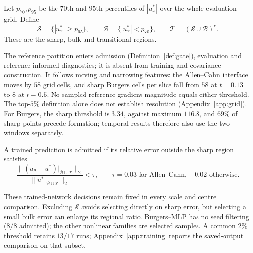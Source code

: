 \begin{samepage}
\begin{definition}\label{def:regions}
Let $p_{70},p_{95}$ be the $70$th and $95$th percentiles of $|u_x^\ast|$ over the
whole evaluation grid. Define
\[
 \mathcal S=\{|u_x^\ast|\ge p_{95}\},\qquad
 \mathcal B=\{|u_x^\ast|<p_{70}\},\qquad
 \mathcal T=(\mathcal S\cup\mathcal B)^c.
\]
These are the sharp, bulk and transitional regions.
\end{definition}
\end{samepage}
The reference partition enters admission (Definition~\ref{def:gate}), evaluation and
reference-informed diagnostics; it is absent from training and covariance construction.
It follows moving and narrowing
features: the Allen--Cahn interface moves by $58$ grid cells, and sharp Burgers cells
per slice fall from $58$ at $t=0.13$ to $8$ at $t=0.5$. No sampled reference-gradient
magnitude equals either threshold. The top-$5\%$ definition alone does not establish resolution
(Appendix~\ref{app:grid}). For Burgers, the sharp threshold is $3.34$, against
maximum $116.8$, and $69\%$ of sharp points precede formation; temporal results
therefore also use the two windows separately.

\begin{samepage}
\begin{definition}\label{def:gate}
A trained prediction is admitted if its relative error outside the sharp region satisfies
\begin{equation*}
 \frac{\| (u_\theta-u^\ast)|_{\mathcal B\cup\mathcal T}\|_2}
      {\| u^\ast|_{\mathcal B\cup\mathcal T}\|_2}<\tau,
 \qquad \tau=0.03\text{ for Allen--Cahn},\quad0.02\text{ otherwise}.
\end{equation*}
\end{definition}
\end{samepage}
These trained-network decisions remain fixed in every scale and centre comparison.
Excluding $\mathcal S$ avoids selecting directly on sharp error, but selecting a small
bulk error can enlarge its regional ratio. Burgers--MLP has no seed filtering
($8/8$ admitted); the other nonlinear families are selected samples. A common
$2\%$ threshold retains $13/17$ runs; Appendix~\ref{app:training} reports the
saved-output comparison on that subset.

